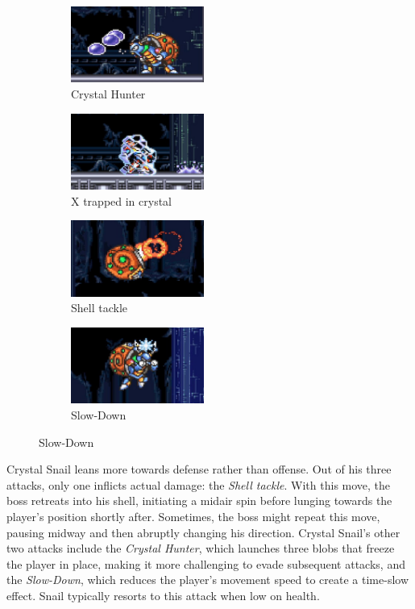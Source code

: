 \begin{figure}[htp]
	\centering
	\begin{subfigure}{0.45\linewidth}
		\centering
		\includegraphics[height=2.5cm]{figures/X2/Crystal_snail/Crystal_hunter.png}
		\caption{Crystal Hunter}
	\end{subfigure}
	\begin{subfigure}{0.45\linewidth}
		\centering
		\includegraphics[height=2.5cm]{figures/X2/Crystal_snail/Crystal_trapped_X.png}
		\caption{X trapped in crystal}
	\end{subfigure}
	\begin{subfigure}{0.45\linewidth}
		\centering
		\includegraphics[height=2.5cm]{figures/X2/Crystal_snail/Crystal_shell_jet.png}
		\caption{Shell tackle}
	\end{subfigure}
	\begin{subfigure}{0.45\linewidth}
		\centering
		\includegraphics[height=2.5cm]{figures/X2/Crystal_snail/Crystal_DM.png}
		\caption{Slow-Down}
	\end{subfigure}
\end{figure}
Crystal Snail leans more towards defense rather than offense. Out of his three attacks, only one inflicts actual damage: the \emph{Shell tackle}. With this move, the boss retreats into his shell, initiating a midair spin before lunging towards the player's position shortly after. Sometimes, the boss might repeat this move, pausing midway and then abruptly changing his direction. Crystal Snail's other two attacks include the \emph{Crystal Hunter}, which launches three blobs that freeze the player in place, making it more challenging to evade subsequent attacks, and the \emph{Slow-Down}, which reduces the player's movement speed to create a time-slow effect. Snail typically resorts to this attack when low on health.

